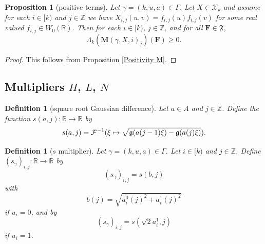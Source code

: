 \documentclass[12pt,reqno]{amsart}
\theoremstyle{plain}
\newtheorem{proposition}[theorem]{Proposition}
\newtheorem{definition}[theorem]{Definition}
\numberwithin{equation}{section}
\theoremstyle{remark}
\newcommand{\uses}[1]{}
\newcommand{\usesdefs}[1]{}
\newcommand{\Z}{{\mathbb Z}}
\newcommand{\R}{{\mathbb R}}
\newcommand{\M}{\mathbf{M}}
\newcommand{\F}{\mathbf{F}}
\begin{document}
\begin{proposition}[positive terms]\label{positive terms}\uses{Positivity M}\usesdefs{auto:Wiener-space-definition,normalized function tuples,auto:prism-form-definition,geometric parameters,double sequence of 2D functions,sandwich kernel}
Let $\gamma=(k,u,a)\in \Gamma$. Let $X\in \mathcal{X}_k$ and assume for each $i\in [k)$ and  $j\in \Z$ we have
 $X_{i,j}(u,v)=f_{i,j}(u)f_{i,j}(v)$ for some real valued $f_{i,j}\in W_0(\R)$.
Then for each $i\in [k)$, $j\in\Z$, and for all $\F\in {\mathfrak{F}}$,
\begin{equation}\label{E:form-nonnegative}
    \Lambda_k(\M(\gamma,X,i)_j)(\mathbf{F})\ge 0.
\end{equation}
\end{proposition}

\begin{proof}
This follows from Proposition \ref{Positivity M}.
\end{proof}

\subsection{\texorpdfstring{Multipliers $H$, $L$, $N$}{Multipliers H, L, N}}

\begin{definition}[square root Gaussian difference]\label{square root Gaussian difference}\uses{}\usesdefs{gaussian,multiplicatively spaced monotone sequences}
Let $a\in A$ and $j\in\Z$.
Define the function $s(a,j):\R \to \R$ by
\begin{equation}\label{auto:diagonal-Gaussian-square-root}s(a,j) = \mathcal{F}^{-1}(\xi \mapsto \sqrt{\mathfrak{g}(a(j-1)\xi)-\mathfrak{g}(a(j) \xi)}).\end{equation}
\end{definition}

\begin{definition}[$s$ multiplier]\label{s multiplier}\uses{}\usesdefs{geometric parameters,square root Gaussian difference}
    Let $\gamma=(k,u,a)\in \Gamma$. Let $i\in [k)$ and
    $j\in \Z$. Define  $(s_{\gamma})_{i,j}: \R \to \R$ by
\begin{equation}\label{E:b-definition}
   (s_{\gamma})_{i,j}=s(b,j)
\end{equation}
with
\begin{equation}\label{auto:combined-scale-b}
   b(j)=\sqrt{a_{i}^0(j)^2 + a_{i}^1(j)^2}
\end{equation}
if $u_i=0$, and by
\begin{equation}\label{auto:sandwich-square-root-factor}
   (s_{\gamma})_{i,j}=s(\sqrt{2}a_{i}^1,j)
\end{equation}
if $u_i=1$.
\end{definition}
\end{document}
